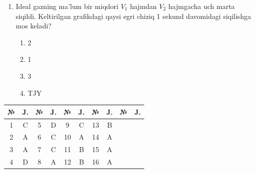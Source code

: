 \begin{enumerate}
\item Ideal gazning ma'lum bir miqdori $V_1$ hajmdan $V_2$ hajmgacha uch marta siqildi. Keltirilgan grafikdagi qaysi egri chiziq 1 sekund davomidagi siqilishga mos keladi?
\begin{enumerate}[label=\Alph*)]
\item 2
\item 1
\item 3
\item TJY
\end{enumerate}

\end{enumerate}


\begin{table}[h!]
\centering
\begin{tabular}{|c|c|c|c|c|c|c|c|c|c|}
\hline
№ & J. & № & J. & № & J. & № & J. & № & J. \\ \hline
1 & C & 5 & D & 9 & C & 13 & B & & \\ \hline
2 & A & 6 & C & 10 & A & 14 & A & & \\ \hline
3 & A & 7 & C & 11 & B & 15 & A & & \\ \hline
4 & D & 8 & A & 12 & B & 16 & A & & \\ \hline
\end{tabular}
\end{table}